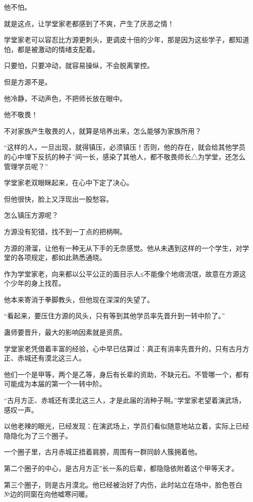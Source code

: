 \begin{this_body}
他不怕。

就是这点，让学堂家老都感到了不爽，产生了厌恶之情！

学堂家老可以容忍比方源更刺头，更调皮十倍的少年，那是因为这些学子，都知道怕，都是被激动的情绪支配着。

只要怕，只要冲动，就容易操纵，不会脱离掌控。

但是方源不是。

他冷静，不动声色，不把师长放在眼中。

他不敬畏！

不对家族产生敬畏的人，就算是培养出来，怎么能够为家族所用？

“这样的人，一旦出现，就得镇压，必须镇压！否则，他的存在，就会给其他学员的心中埋下反抗的种子”间一长，感染了其他人，都不敬畏师长△为学堂，还怎么管理学员呢？”

学堂家老双眼眯起来，在心中下定了决心。

但他很快，脸上又浮现出一股愁容。

怎么镇压方源呢？

方源没有犯错，找不到一丁点的把柄啊。

方源的滑溜，让他有一种无从下手的无奈感觉。他从未遇到这样的一个学生，对学堂的各项规定，都如此熟悉通晓。

作为学堂家老，向来都以公平公正的面目示人≤不能像个地痞流氓，故意在方源这个少年的身上找茬。

他本来寄消于拳脚教头，但他现在深深的失望了。

“看起来，要压住方源的风头，只有等到其他学员率先晋升到一转中阶了。”

蛊师要晋升，最大的影响因素就是资质。

学堂家老凭借着丰富的经验，心中早已估算过：真正有消率先晋升的，只有古月方正、赤城还有漠北这三人。

他们一个是甲等，两个是乙等，身后有长辈的资助，不缺元石。不管哪一个，都有可能成为本届的第一个一转中阶。

“古月方正、赤城还有漠北这三人，才是此届的消种子啊。”学堂家老望着演武场，感叹一声。

以他老辣的眼光，已经发现：在演武场上，学员们看似随意地站立着，实际上已经隐隐化为了三个圈子。

一个圈子里，古月赤城正捂着肩膀，周围有一群同龄人簇拥着他。

第二个圈子的中心，是古月方正″长一系的后辈，都隐隐依附着这个甲等天才。

第三个圈子，则是古月漠北。他已经被治好了内伤，此时站立在场中，脸色苍白№边的同窗在向他嘘寒问暖。


\end{this_body}
